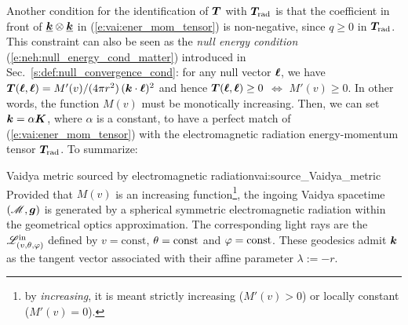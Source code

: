 Another condition for the identification of $\bm{T}$ with $\bm{T}_{\rm rad}$ is that the coefficient
in front of $\underline{\bm{k}} \otimes \underline{\bm{k}}$ in (\ref{e:vai:ener_mom_tensor})
is non-negative, since $q\geq 0$ in $\bm{T}_{\rm rad}$. This constraint can also be seen as the \emph{null energy condition} (\ref{e:neh:null_energy_cond_matter}) introduced in
Sec.~\ref{s:def:null_convergence_cond}: for any null vector $\bm{\ell}$, we have
$\bm{T}(\bm{\ell},\bm{\ell}) = M'(v)/(4\pi r^2)\, (\bm{k}\cdot\bm{\ell})^2$ and hence $\bm{T}(\bm{\ell},\bm{\ell}) \geq 0$ $\iff$
$M'(v) \geq 0$. In other words, the function $M(v)$ must be monotically increasing. Then, we can set
$\bm{k} = \alpha \bm{K}$, where $\alpha$ is a constant, to have a perfect match of (\ref{e:vai:ener_mom_tensor}) with the electromagnetic radiation energy-momentum
tensor $\bm{T}_{\rm rad}$.
To summarize:

\begin{tprop}{Vaidya metric sourced by electromagnetic radiation}{vai:source_Vaidya_metric}
Provided that $M(v)$ is an increasing function\footnote{by \emph{increasing}, it is meant
strictly increasing ($M'(v)>0$) or locally constant ($M'(v) = 0$).},
the ingoing Vaidya spacetime $(\mathscr{M},\bm{g})$ is generated by a spherical symmetric electromagnetic radiation
within the geometrical optics approximation. The corresponding light rays are the
$\mathscr{L}^{\rm in}_{(v,\theta,\varphi)}$
defined by $v=\mathrm{const}$, $\theta=\mathrm{const}$ and $\varphi=\mathrm{const}$.
These geodesics admit $\bm{k}$ as the tangent vector associated with their affine parameter
$\lambda := -r$.
\end{tprop}

